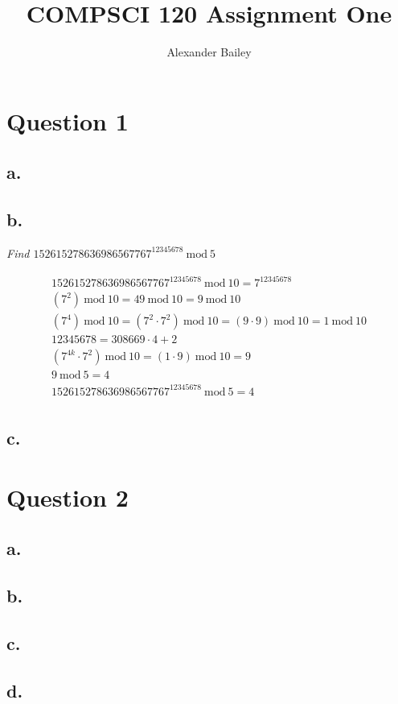 \documentclass[a4paper, 12pt]{article}
\title{COMPSCI 120 Assignment One}
\author{Alexander Bailey}
\newcommand{\Mod}[1]{\ \mathrm{mod}\ #1}
\begin{document}
\maketitle
\section*{Question 1}
\subsection*{a.}
\subsection*{b.}
\begin{center}
    \textit{Find $152615278636986567767^{12345678} \Mod 5$}
\end{center}
\begin{align*}
    152615278636986567767^{12345678} \Mod 10 = 7^{12345678} \\
    (7^2) \Mod 10 = 49 \Mod 10 = 9 \Mod 10 \\
    (7^4) \Mod 10 = (7^2 \cdot 7^2) \Mod 10 = (9 \cdot 9) \Mod 10 = 1 \Mod 10 \\
    12345678 = 308669 \cdot 4 + 2 \\
    (7^{4k} \cdot 7^2) \Mod 10 = (1\cdot9)\Mod10 = 9 \\
    9 \Mod 5 = 4 \\
    152615278636986567767^{12345678} \Mod 5 = 4 \\
\end{align*} 

\subsection*{c.}
\section*{Question 2}
\subsection*{a.}
\subsection*{b.}
\subsection*{c.}
\subsection*{d.}
\end{document}
